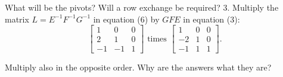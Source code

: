 What will be the pivots? Will a row exchange be required?
3. Multiply the matrix $L=E^{-1} F^{-1} G^{-1}$ in equation (6) by $G F E$ in equation (3):
$$
\left[\begin{array}{ccc}
1 & 0 & 0 \\
2 & 1 & 0 \\
-1 & -1 & 1
\end{array}\right] \text { times }\left[\begin{array}{ccc}
1 & 0 & 0 \\
-2 & 1 & 0 \\
-1 & 1 & 1
\end{array}\right] .
$$

Multiply also in the opposite order. Why are the answers what they are?

